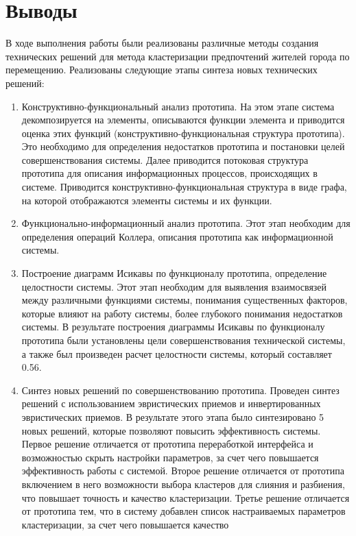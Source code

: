 \chapter{Выводы}
В ходе выполнения работы были реализованы различные методы создания технических
решений для метода кластеризации предпочтений жителей города по перемещению.
Реализованы следующие этапы синтеза новых технических решений:
\begin{enumerate}
  \item Конструктивно-функциональный анализ прототипа. На этом этапе система
    декомпозируется на элементы, описываются функции элемента и приводится
    оценка этих функций (конструктивно-функциональная структура прототипа). Это
    необходимо для определения недостатков прототипа и постановки целей
    совершенствования системы. Далее приводится потоковая структура
    прототипа для описания информационных процессов, происходящих в системе.
    Приводится конструктивно-функциональная структура в виде графа, на которой
    отображаются элементы системы и их функции.
  \item Функционально-информационный анализ прототипа. Этот этап необходим для
    определения операций Коллера, описания прототипа как информационной
    системы. 
  \item Построение диаграмм Исикавы по функционалу прототипа, определение
    целостности системы. Этот этап необходим для выявления взаимосвязей между
    различными функциями системы, понимания существенных факторов, которые
    влияют на работу системы, более глубокого понимания недостатков системы.
    В результате построения диаграммы Исикавы по функционалу прототипа были
    установлены цели совершенствования технической системы, а также был
    произведен расчет целостности системы, который составляет 0.56.
  \item Синтез новых решений по совершенствованию прототипа. Проведен синтез
    решений с использованием эвристических приемов и инвертированных
    эвристических приемов. В результате этого этапа было синтезировано 5 новых
    решений, которые позволяют повысить эффективность системы.
    Первое решение отличается от прототипа переработкой интерфейса и
    возможностью скрыть настройки параметров, за счет чего повышается
    эффективность работы с системой.
    Второе решение отличается от прототипа включением в него возможности
    выбора кластеров для слияния и разбиения, что повышает точность и качество
    кластеризации.
    Третье решение отличается от прототипа тем, что в систему добавлен список
    настраиваемых параметров кластеризации, за счет чего повышается качество

\end{enumerate}
